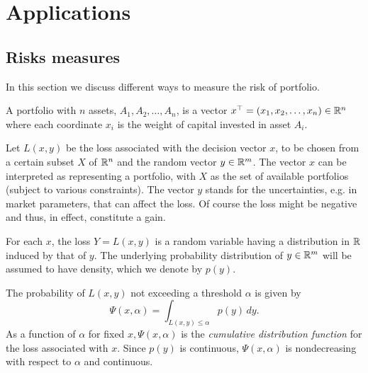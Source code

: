 \chapter{Applications} \label{chap:App}

\section{Risks measures}

In this section we discuss different ways to measure the risk of portfolio.


\begin{definition}
	A portfolio with $n$ assets, $A_1, A_2, \dots, A_n$, is a vector $x^\top = (x_1, x_2, \dots, x_n)\in \mathbb{R}^n$ where each coordinate $x_i$ is the weight of capital invested in asset $A_i$.
\end{definition}

Let $L(x,y)$ be the loss associated with the decision vector $x$, to be chosen from a certain subset $X$ of $\mathbb{R}^n$ and the random vector $y \in \mathbb{R}^m$. The vector $x$ can be interpreted as representing a portfolio, with $X$ as the set of available portfolios
(subject to various constraints). The vector $y$ stands for the uncertainties, e.g. in market parameters, that can affect the loss. Of course the loss might be negative and thus, in effect, constitute a gain.

For each $x$, the loss $Y=L(x,y)$ is a random variable having a distribution in $\mathbb{R}$ induced by that of $y$. The underlying probability distribution of $y \in \mathbb{R}^m$ will be assumed to have density, which we denote by $p(y)$.

The probability of $L(x,y)$ not exceeding a threshold $\alpha$ is given by
\[
	\Psi (x,\alpha) = \int_{L(x,y)\leq \alpha} p(y)\,dy.
\]
As a function of $\alpha$ for fixed $x, \Psi(x, \alpha)$ is the \textit{cumulative distribution function} for the loss associated with $x$. Since $p(y)$ is continuous, $\Psi(x, \alpha)$ is nondecreasing with respect to $\alpha$ and continuous.




